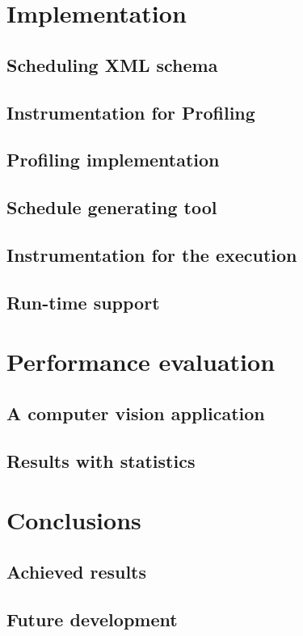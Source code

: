 \documentclass[a4paper,11pt,oneside]{book}
\begin{document}
 


\chapter{Implementation}
\section{Scheduling XML schema}
\section{Instrumentation for Profiling}
\section{Profiling implementation}
\section{Schedule generating tool}
\section{Instrumentation for the execution}
\section{Run-time support}

\chapter{Performance evaluation}
\section{A computer vision application}
\section{Results with statistics}

\chapter{Conclusions}
\section{Achieved results}
\section{Future development}
\end{document}

